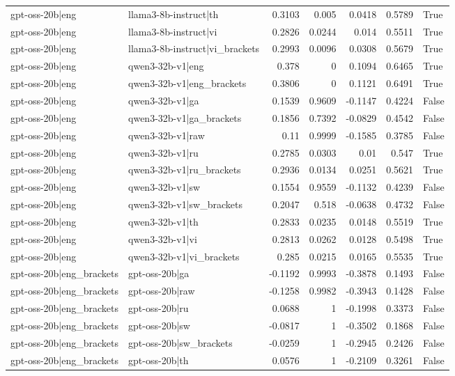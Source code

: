 \begin{table}
\begin{tabular}{l l r r r r l}
gpt-oss-20b|eng & llama3-8b-instruct|th & 0.3103 & 0.005 & 0.0418 & 0.5789 & True \\
gpt-oss-20b|eng & llama3-8b-instruct|vi & 0.2826 & 0.0244 & 0.014 & 0.5511 & True \\
gpt-oss-20b|eng & llama3-8b-instruct|vi_brackets & 0.2993 & 0.0096 & 0.0308 & 0.5679 & True \\
gpt-oss-20b|eng & qwen3-32b-v1|eng & 0.378 & 0 & 0.1094 & 0.6465 & True \\
gpt-oss-20b|eng & qwen3-32b-v1|eng_brackets & 0.3806 & 0 & 0.1121 & 0.6491 & True \\
gpt-oss-20b|eng & qwen3-32b-v1|ga & 0.1539 & 0.9609 & -0.1147 & 0.4224 & False \\
gpt-oss-20b|eng & qwen3-32b-v1|ga_brackets & 0.1856 & 0.7392 & -0.0829 & 0.4542 & False \\
gpt-oss-20b|eng & qwen3-32b-v1|raw & 0.11 & 0.9999 & -0.1585 & 0.3785 & False \\
gpt-oss-20b|eng & qwen3-32b-v1|ru & 0.2785 & 0.0303 & 0.01 & 0.547 & True \\
gpt-oss-20b|eng & qwen3-32b-v1|ru_brackets & 0.2936 & 0.0134 & 0.0251 & 0.5621 & True \\
gpt-oss-20b|eng & qwen3-32b-v1|sw & 0.1554 & 0.9559 & -0.1132 & 0.4239 & False \\
gpt-oss-20b|eng & qwen3-32b-v1|sw_brackets & 0.2047 & 0.518 & -0.0638 & 0.4732 & False \\
gpt-oss-20b|eng & qwen3-32b-v1|th & 0.2833 & 0.0235 & 0.0148 & 0.5519 & True \\
gpt-oss-20b|eng & qwen3-32b-v1|vi & 0.2813 & 0.0262 & 0.0128 & 0.5498 & True \\
gpt-oss-20b|eng & qwen3-32b-v1|vi_brackets & 0.285 & 0.0215 & 0.0165 & 0.5535 & True \\
gpt-oss-20b|eng_brackets & gpt-oss-20b|ga & -0.1192 & 0.9993 & -0.3878 & 0.1493 & False \\
gpt-oss-20b|eng_brackets & gpt-oss-20b|raw & -0.1258 & 0.9982 & -0.3943 & 0.1428 & False \\
gpt-oss-20b|eng_brackets & gpt-oss-20b|ru & 0.0688 & 1 & -0.1998 & 0.3373 & False \\
gpt-oss-20b|eng_brackets & gpt-oss-20b|sw & -0.0817 & 1 & -0.3502 & 0.1868 & False \\
gpt-oss-20b|eng_brackets & gpt-oss-20b|sw_brackets & -0.0259 & 1 & -0.2945 & 0.2426 & False \\
gpt-oss-20b|eng_brackets & gpt-oss-20b|th & 0.0576 & 1 & -0.2109 & 0.3261 & False \\

\end{tabular}
\end{table}
